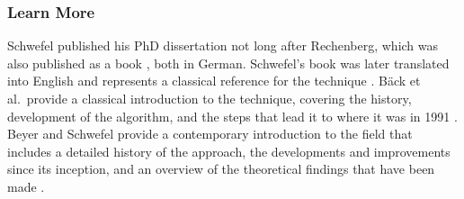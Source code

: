 % 
\subsubsection{Learn More}
Schwefel published his PhD dissertation \cite{Schwefel1975} not long after Rechenberg, which was also published as a book \cite{Schwefel1977}, both in German. Schwefel's book was later translated into English and represents a classical reference for the technique \cite{Schwefel1981}. 
B\"ack et al.\ provide a classical introduction to the technique, covering the history, development of the algorithm, and the steps that lead it to where it was in 1991 \cite{Back1991}.
Beyer and Schwefel provide a contemporary introduction to the field that includes a detailed history of the approach, the developments and improvements since its inception, and an overview of the theoretical findings that have been made \cite{Beyer2002}.
